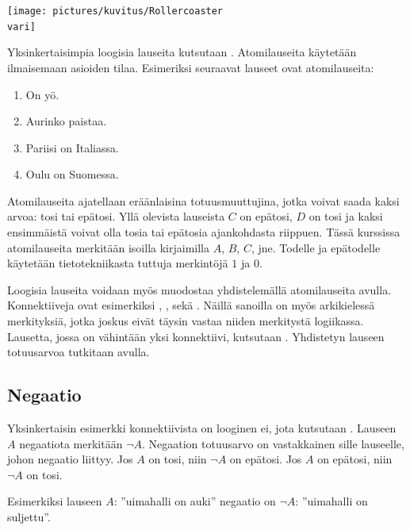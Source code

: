 \bigskip

\begin{center}
\texttt{[image: pictures/kuvitus/Rollercoaster\\vari]}
\end{center}

\bigskip

Yksinkertaisimpia loogisia lauseita kutsutaan . Atomilauseita käytetään ilmaisemaan asioiden tilaa. Esimeriksi seuraavat lauseet ovat atomilauseita:
\begin{enumerate}[$A:$]
\item On yö.
\item Aurinko paistaa.
\item Pariisi on Italiassa.
\item Oulu on Suomessa.
\end{enumerate}
Atomilauseita ajatellaan eräänlaisina totuusmuuttujina, jotka voivat saada kaksi arvoa: tosi tai epätosi. Yllä olevista lauseista $C$ on epätosi, $D$ on tosi ja kaksi ensimmäistä voivat olla tosia tai epätosia ajankohdasta riippuen. Tässä kurssissa atomilauseita merkitään isoilla kirjaimilla $A$, $B$, $C$, jne. Todelle ja epätodelle käytetään tietotekniikasta tuttuja merkintöjä $1$ ja $0$.

\newpage

Loogisia lauseita voidaan myös muodostaa yhdistelemällä atomilauseita  avulla. Konnektiiveja ovat esimerkiksi , ,  sekä . Näillä sanoilla on myös arkikielessä merkityksiä, jotka joskus eivät täysin vastaa niiden merkitystä logiikassa. Lausetta, jossa on vähintään yksi konnektiivi, kutsutaan . Yhdistetyn lauseen totuusarvoa tutkitaan  avulla.

\subsection*{Negaatio} Yksinkertaisin esimerkki konnektiivista on looginen ei, jota kutsutaan . Lauseen $A$ negaatiota merkitään $\lnot A$. Negaation totuusarvo on vastakkainen sille lauseelle, johon negaatio liittyy. Jos $A$ on tosi, niin $\lnot A$ on epätosi. Jos $A$ on epätosi, niin $\lnot A$ on tosi.

Esimerkiksi lauseen $A$: ''uimahalli on auki'' negaatio on $\lnot A$: ''uimahalli on suljettu''.

